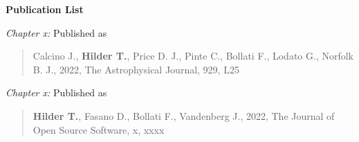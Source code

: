 \thispagestyle{plain}


\begin{center}
    
    {\Large \textbf{Publication List}}
    
\end{center}

\setlength{\parindent}{0pt}

\textit{Chapter x:} Published as

\begin{quote}
    Calcino J., \textbf{Hilder T.}, Price D. J., Pinte C., Bollati F., Lodato G., Norfolk B. J., 2022, The Astrophysical Journal, 929, L25
\end{quote}

\textit{Chapter x:} Published as

\begin{quote}
    \textbf{Hilder T.}, Fasano D., Bollati F., Vandenberg J., 2022, The Journal of Open Source Software, x, xxxx
\end{quote}

\newpage